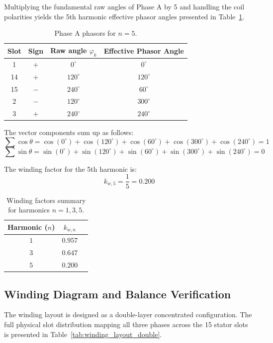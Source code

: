 \documentclass[12pt, a4paper]{article}
\begin{document}
Multiplying the fundamental raw angles of Phase A by 5 and handling the coil polarities yields the 5th harmonic effective phasor angles presented in Table~\ref{tab:phasors_phase_a5}.

\begin{table}[h!]
\centering
\caption{Phase A phasors for $n=5$.}
\label{tab:phasors_phase_a5}
\begin{tabular}{cccc}
\toprule
\textbf{Slot} & \textbf{Sign} & \textbf{Raw angle $\varphi_k$} & \textbf{Effective Phasor Angle} \\
\midrule
 1  & $+$ & $0^\circ$   & $0^\circ$ \\
 14 & $+$ & $120^\circ$ & $120^\circ$ \\
 15 & $-$ & $240^\circ$ & $60^\circ$ \\
 2  & $-$ & $120^\circ$ & $300^\circ$ \\
 3  & $+$ & $240^\circ$ & $240^\circ$ \\
\bottomrule
\end{tabular}
\end{table}

The vector components sum up as follows:
\[\sum \cos\theta = \cos(0^\circ) + \cos(120^\circ) + \cos(60^\circ) + \cos(300^\circ) + \cos(240^\circ) = 1\]
\[\sum \sin\theta = \sin(0^\circ) + \sin(120^\circ) + \sin(60^\circ) + \sin(300^\circ) + \sin(240^\circ) = 0\]

The winding factor for the 5th harmonic is:
\[k_{w,5} = \frac{1}{5} = \mathbf{0.200}\]


\begin{table}[h!]
\centering
\caption{Winding factors summary for harmonics $n=1,3,5$.}
\begin{tabular}{ccc}
\toprule
\textbf{Harmonic ($n$)} & \textbf{$k_{w,n}$}\\
\midrule
$1$  & $0.957$ \\
$3$  & $0.647$ \\
$5$  & $0.200$ \\
\bottomrule
\end{tabular}
\end{table}


\subsection{Winding Diagram and Balance Verification}

The winding layout is designed as a double-layer concentrated configuration. The full physical slot distribution mapping all three phases across the 15 stator slots is presented in Table~\ref{tab:winding_layout_double}.
\end{document}
